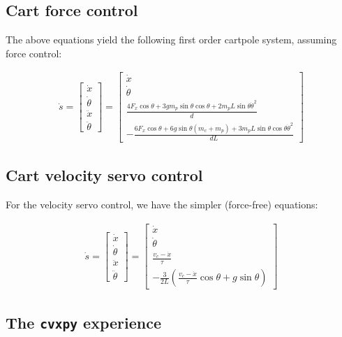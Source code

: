 \documentclass[twoside,11pt]{article}
\begin{document}
\subsection{Cart force control}

The above equations yield the following first order cartpole system, assuming force control:


\begin{align}
\dot{s} = 
\begin{bmatrix}
\dot{x} \\
\dot{\theta} \\
\ddot{x} \\
\ddot{\theta} 
\end{bmatrix}
=
\begin{bmatrix}
\dot{x} \\
\dot{\theta} \\
\frac{4 F_x \cos{\theta} + 3 g m_p \sin{\theta}\cos{\theta} + 2 m_p L \sin{\theta}\dot{\theta}^2 }{d} \\
-\frac{6 F_x \cos{\theta} + 6 g \sin{\theta}\left( m_c + m_p \right) + 3 m_p L \sin{\theta}\cos{\theta}\dot{\theta}^2 }{d L}
\end{bmatrix}
\end{align}


\subsection{Cart velocity servo control}

For the velocity servo control, we have the simpler (force-free) equations:

\begin{align}
\dot{s} = 
\begin{bmatrix}
\dot{x} \\
\dot{\theta} \\
\ddot{x} \\
\ddot{\theta} 
\end{bmatrix}
=
\begin{bmatrix}
\dot{x} \\
\dot{\theta} \\
\frac{v_c - \dot{x}}{\tau} \\
- \frac{3}{2L} \left(  \frac{v_c - \dot{x}}{\tau} \cos{\theta} + g \sin{\theta} \right)
\end{bmatrix}
\end{align}

\subsection{The \texttt{cvxpy} experience}
\end{document}
